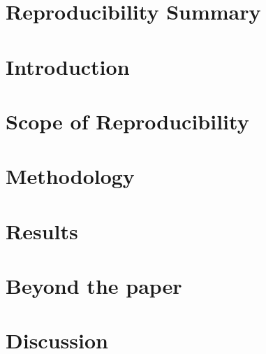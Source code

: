 \documentclass[10pt]{article}
\begin{document}
\section*{Reproducibility Summary}

\section{Introduction}

\section{Scope of Reproducibility}

\section{Methodology}

\section{Results}

\section{Beyond the paper}

\section{Discussion}


\end{document}
